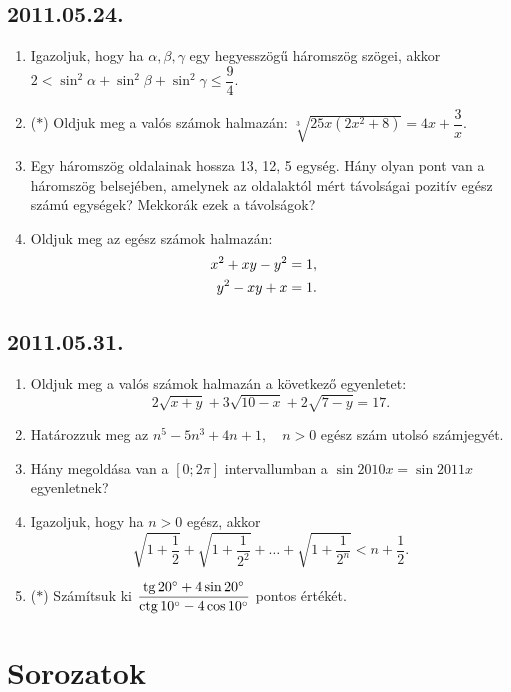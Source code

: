 \subsection*{2011.05.24.}
\begin{enumerate}
\item Igazoljuk, hogy ha $\alpha, \beta, \gamma$ egy hegyesszögű háromszög szögei, akkor $2<\sin^2 \alpha+\sin^2\beta+\sin^2\gamma\le\dfrac{9}{4}$.
\item ($*$) Oldjuk meg a valós számok halmazán: $\sqrt[3]{25x(2x^2+8)}=4x+\dfrac{3}{x}$.
\item Egy háromszög oldalainak hossza 13, 12, 5 egység. Hány olyan pont van a háromszög belsejében, amelynek az oldalaktól mért távolságai pozitív egész számú egységek? Mekkorák ezek a távolságok?
\item Oldjuk meg az egész számok halmazán:
\begin{align*}
x^2+xy-y^2&= 1,\cr
y^2-xy+x&=1.
\end{align*}
\end{enumerate}

\subsection*{2011.05.31.}
\begin{enumerate}
\item Oldjuk meg a valós számok halmazán a következő egyenletet:
$$2\sqrt{x+y}+3\sqrt{10-x}+2\sqrt{7-y}=17.$$
\item Határozzuk meg az $n^5-5n^3+4n+1,\quad n>0$ egész szám utolsó számjegyét.
\item Hány megoldása van a $[0;2\pi]$ intervallumban a $\sin 2010x=\sin 2011x$
egyenletnek?
\item Igazoljuk, hogy ha $n>0$ egész, akkor
$$\sqrt{1+\frac{1}{2}}+
\sqrt{1+\frac{1}{2^2}}+\ldots+
\sqrt{1+\frac{1}{2^n}}<n+\frac{1}{2}.
$$
\item ($*$) Számítsuk ki $\dfrac{\mathop{\mathrm{tg}}\nolimits 20^\circ+4\sin 20^\circ}{\mathop{\mathrm{ctg}}\nolimits 10^\circ-4\cos 10^\circ}$ pontos értékét.
\end{enumerate}

\section{Sorozatok}


